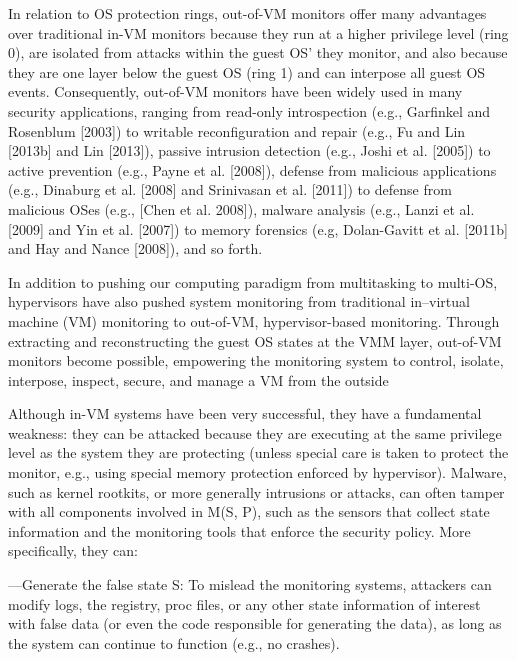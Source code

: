 \documentclass{report}
\begin{document}
\begin{spacing}{1.5}
{\large
In relation to OS protection rings, out-of-VM monitors offer many advantages over traditional in-VM monitors because
they run at a higher privilege level (ring 0), are isolated from attacks within the guest
OS' they monitor, and also because they are one layer below the guest OS (ring 1)  and can
interpose all guest OS events. Consequently, out-of-VM monitors have been widely used
in many security applications, ranging from read-only introspection (e.g., Garfinkel and
Rosenblum [2003]) to writable reconfiguration and repair (e.g., Fu and Lin [2013b] and
Lin [2013]), passive intrusion detection (e.g., Joshi et al. [2005]) to active prevention
(e.g., Payne et al. [2008]), defense from malicious applications (e.g., Dinaburg et al.
[2008] and Srinivasan et al. [2011]) to defense from malicious OSes (e.g., [Chen et al. 2008]), malware analysis (e.g., Lanzi et al. [2009] and Yin et al. [2007]) to memory
forensics (e.g, Dolan-Gavitt et al. [2011b] and Hay and Nance [2008]), and so forth.
\newline
}





In addition to pushing our computing paradigm from multitasking to multi-OS, hypervisors have also pushed system monitoring from traditional in–virtual machine (VM) monitoring to out-of-VM, hypervisor-based monitoring. Through extracting and reconstructing the guest OS states at the VMM layer, out-of-VM monitors become
possible, empowering the monitoring system to control, isolate, interpose, inspect, secure, and manage a VM from the outside


Although in-VM systems have been very successful, they have a
fundamental weakness: they can be attacked because they are executing at the same
privilege level as the system they are protecting (unless special care is taken to protect
the monitor, e.g., using special memory protection enforced by hypervisor). Malware,
such as kernel rootkits, or more generally intrusions or attacks, can often tamper with
all components involved in M(S, P), such as the sensors that collect state information
and the monitoring tools that enforce the security policy. More specifically, they can:

—Generate the false state S: To mislead the monitoring systems, attackers can modify
logs, the registry, proc files, or any other state information of interest with false data
(or even the code responsible for generating the data), as long as the system can
continue to function (e.g., no crashes).


\end{spacing}
\end{document}
